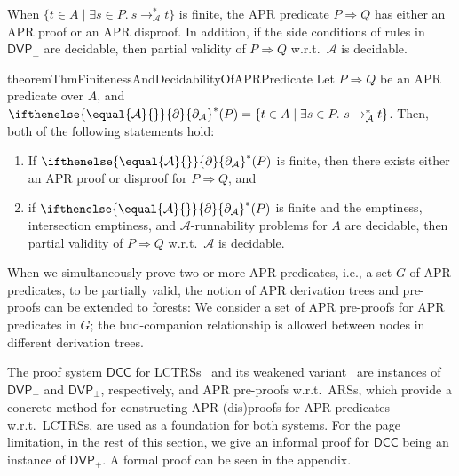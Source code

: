 \documentclass[10pt,a4paper]{article}
\def\cA{\mathcal{A}}
\def\cR{\mathcal{R}}
\newcommand{\ReachPred}[2]{#1 \Rightarrow #2}
\newcommand{\Derivative}[1][\cR]{\ifthenelse{\equal{#1}{}}{\partial}{\partial_{#1}}}
\newcommand{\DVPnew}[1][]{\mathsf{DVP}_+}
\newcommand{\CDVPnew}[1][]{\mathsf{DVP}_\bot}
\newcommand{\DCC}[1][]{\mathsf{DCC}}
\begin{document}
When $\{ t \in A \mid \exists s \in P.\ s \to_\cA^* t \}$ is finite,
the APR predicate $\ReachPred{P}{Q}$ has either an APR proof or an APR disproof.
In addition, if the side conditions of rules in $\CDVPnew$ are decidable,
then partial validity of $\ReachPred{P}{Q}$ w.r.t.\ $\cA$ is decidable.

\begin{restatable}{theorem}{ThmFinitenessAndDecidabilityOfAPRPredicate}
	\label{thm:finiteness-and-decidability-of-APR-predicates}
	Let $\ReachPred{P}{Q}$ be an APR predicate over $A$,
	and $\Derivative[\cA]^*(P) = \{ t \in A \mid \exists s \in P.\ s \to_\cA^* t \}$.
	Then, both of the following statements hold:
	\begin{enumerate}
		\renewcommand{\labelenumi}{(\arabic{enumi})}
		\leftskip=1ex
		\item
		      If $\Derivative[\cA]^*(P)$ is finite, then there exists either an APR proof or disproof for $\ReachPred{P}{Q}$,
		      and
		\item if $\Derivative[\cA]^*(P)$ is finite and the emptiness, intersection emptiness, and $\cA$-runnability problems for $A$ are decidable, then partial validity of $\ReachPred{P}{Q}$ w.r.t.\ $\cA$
		      is decidable.
	\end{enumerate}
\end{restatable}




When we simultaneously prove two or more APR predicates, i.e., a set $G$ of APR predicates, to be partially valid, the notion of APR derivation trees and pre-proofs can be extended to forests:
We consider a set of APR pre-proofs for APR predicates in $G$;
the bud-companion relationship is allowed between nodes in different derivation trees.

The proof system $\DCC$ for LCTRSs~\cite{CL18} and its weakened variant~\cite{KN23jlamp} are instances of $\DVPnew$ and $\CDVPnew$, respectively,
and APR pre-proofs w.r.t.\ ARSs, which provide a concrete method for constructing APR (dis)proofs for APR predicates w.r.t.\ LCTRSs, are used as a foundation for both systems.
For the page limitation, in the rest of this section, we give an informal proof for $\DCC$ being an instance of $\DVPnew$.
A formal proof can be seen in the appendix.
\end{document}
